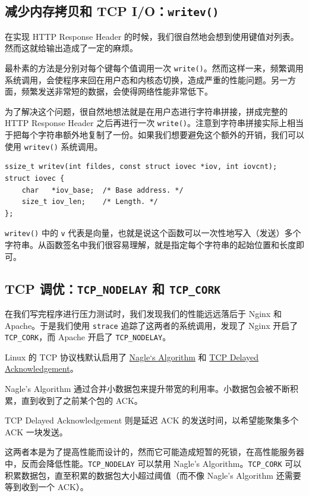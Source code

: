 \documentclass[a4paper]{article}
\begin{document}
\subsection{减少内存拷贝和 TCP I/O：\texttt{writev()}}

在实现 HTTP Response Header 的时候，我们很自然地会想到使用键值对列表。然而这就给输出造成了一定的麻烦。

最朴素的方法是分别对每个键每个值调用一次 \texttt{write()}。然而这样一来，频繁调用系统调用，会使程序来回在用户态和内核态切换，造成严重的性能问题。另一方面，频繁发送非常短的数据，会使得网络性能非常低下。

为了解决这个问题，很自然地想法就是在用户态进行字符串拼接，拼成完整的 HTTP Response Header 之后再进行一次 \texttt{write()}。注意到字符串拼接实际上相当于把每个字符串额外地复制了一份。如果我们想要避免这个额外的开销，我们可以使用 \texttt{writev()} 系统调用。

\begin{verbatim}
ssize_t writev(int fildes, const struct iovec *iov, int iovcnt);
struct iovec {
    char   *iov_base;  /* Base address. */
    size_t iov_len;    /* Length. */
};
\end{verbatim}

\texttt{writev()} 中的 \texttt{v} 代表是向量，也就是说这个函数可以一次性地写入（发送）多个字符串。从函数签名中我们很容易理解，就是指定每个字符串的起始位置和长度即可。

\subsection{TCP 调优：\texttt{TCP\_NODELAY} 和 \texttt{TCP\_CORK}}

在我们写完程序进行压力测试时，我们发现我们的性能远远落后于 Nginx 和 Apache。于是我们使用 \texttt{strace} 追踪了这两者的系统调用，发现了 Nginx 开启了 \texttt{TCP\_CORK}，而 Apache 开启了 \texttt{TCP\_NODELAY}。

Linux 的 TCP 协议栈默认启用了 \href{http://en.wikipedia.org/wiki/Nagle's_algorithm}{Nagle`s Algorithm} 和 \href{http://en.wikipedia.org/wiki/TCP_delayed_acknowledgment}{TCP Delayed Acknowledgement}。

Nagle's Algorithm 通过合并小数据包来提升带宽的利用率。小数据包会被不断积累，直到收到了之前某个包的 ACK。

TCP Delayed Acknowledgement 则是延迟 ACK 的发送时间，以希望能聚集多个 ACK 一块发送。

这两者本是为了提高性能而设计的，然而它可能造成短暂的死锁，在高性能服务器中，反而会降低性能。\texttt{TCP\_NODELAY} 可以禁用 Nagle's Algorithm。\texttt{TCP\_CORK} 可以积累数据包，直至积累的数据包大小超过阈值（而不像 Nagle's Algorithm 还需要等到收到一个 ACK）。
\end{document}
